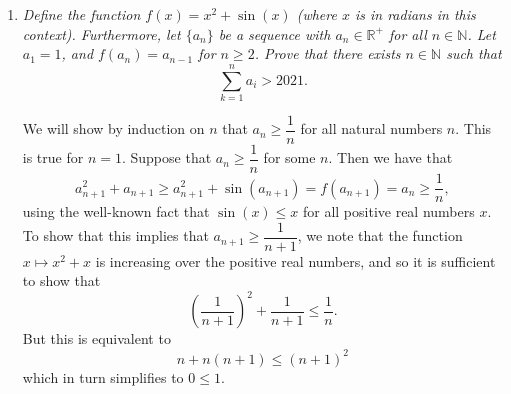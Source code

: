 \documentclass{article}
\begin{document}
\begin{enumerate}[1.]
\begin{proof}
	Let $p$ be the largest prime number that divides $n$, and let $p^k$ be the largest power of $p$ that divides $n$. Let $a = \dfrac{n}{p^k(p - 1)}$. Clearly $a < n$. We claim that $a$ is sufficiently factorial-like.

	Suppose that $p_1, p_2, \dots, p_k$ be distinct prime factors of $a$. Then $p_1, p_2, \dots, p_k, p$ are distinct prime factors of $n$, and so since $n$ is sufficiently factorial-like, we have that
	\[
		(p_1 - 1)(p_2 - 1) \dotsb (p_k - 1)(p - 1) \mid n = p^k(p - 1) a.
	\]
	Since $p$ was the largest prime factor of $n$, we have that $p \geq p_i > p_i - 1$ for each $i$, and so $p$ does not divide $p_i - 1$. It follows that
	\[
		\gcd((p_1 - 1)(p_2 - 1) \dotsb (p_k - 1), p^k) = 1,
	\]
	and so we have that $(p_1 - 1)(p_2 - 1) \dotsb (p_k - 1)$ divides $a$ by Euclid's Lemma. We see that $a$ is indeed sufficiently factorial-like. By the induction hypothesis, there is a natural number $b$ such that $\varphi(b) = a$, and such that all of the prime factors of $b$ are prime factors of $a$. This implies that $p$ is not a prime factor of $b$, and so the numbers $p^{k + 1}$ and $b$ are relatively prime. Let $m = p^{k + 1} b$. Then
	\[
		\varphi(m) = \varphi\left(p^{k + 1} b\right) = \varphi\left(p^{k + 1}\right) \varphi(b) = p^k (p - 1) a = n.
	\]

	Since all of the prime factors of $m$ are also factors of $n$ (they are either $p$, which is a factor of $n$, or a prime factor of $b$, thus a factor of $a$, thus a factor of $n$) we see that the desired result holds true for $n$ as well. By the principle of strong mathematical induction, we have that the lemma is true for all sufficiently factorial-like natural numbers $n$.
\end{proof}


\vspace{24pt}
\item %
{\itshape Define the function $f(x) = x^2 + \sin(x)$ (where $x$ is in radians in this context). Furthermore, let $\{a_n\}$ be a sequence with $a_n \in \mathbb{R}^+$ for all $n \in \mathbb{N}$. Let $a_1 = 1$, and $f(a_n) = a_{n - 1}$ for $n \ge 2$. Prove that there exists $n \in \mathbb{N}$ such that 
$$\sum_{k = 1}^n a_i > 2021.$$}

We will show by induction on $n$ that $a_n \geq \dfrac{1}{n}$ for all natural numbers $n$. This is true for $n = 1$. Suppose that $a_n \geq \dfrac{1}{n}$ for some $n$. Then we have that
\[
	a_{n + 1}^2 + a_{n + 1} \geq a_{n + 1}^2 + \sin(a_{n + 1}) = f(a_{n + 1}) = a_n \geq \dfrac{1}{n},
\]
using the well-known fact that $\sin(x) \leq x$ for all positive real numbers $x$. To show that this implies that $a_{n + 1} \geq \dfrac{1}{n + 1}$, we note that the function $x \mapsto x^2 + x$ is increasing over the positive real numbers, and so it is sufficient to show that
\[
	\left(\frac{1}{n + 1}\right)^2 + \frac{1}{n + 1} \leq \dfrac{1}{n}.
\]
But this is equivalent to
\[
	n + n(n + 1) \leq (n + 1)^2
\]
which in turn simplifies to $0 \leq 1$.


\end{enumerate}
\end{document}
